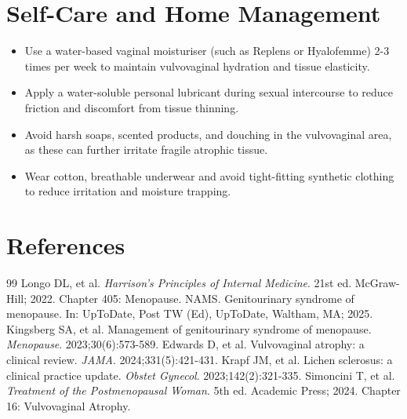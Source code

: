 \section*{Self-Care and Home Management}
\begin{itemize}
  \item Use a water-based vaginal moisturiser (such as Replens or Hyalofemme) 2-3 times per week to maintain vulvovaginal hydration and tissue elasticity.
  \item Apply a water-soluble personal lubricant during sexual intercourse to reduce friction and discomfort from tissue thinning.
  \item Avoid harsh soaps, scented products, and douching in the vulvovaginal area, as these can further irritate fragile atrophic tissue.
  \item Wear cotton, breathable underwear and avoid tight-fitting synthetic clothing to reduce irritation and moisture trapping.
\end{itemize}

\section*{References}

\begin{thebibliography}{99}
 Longo DL, et al. \emph{Harrison's Principles of Internal Medicine}. 21st ed. McGraw-Hill; 2022. Chapter 405: Menopause.
 NAMS. Genitourinary syndrome of menopause. In: UpToDate, Post TW (Ed), UpToDate, Waltham, MA; 2025.
 Kingsberg SA, et al. Management of genitourinary syndrome of menopause. \emph{Menopause}. 2023;30(6):573-589.
 Edwards D, et al. Vulvovaginal atrophy: a clinical review. \emph{JAMA}. 2024;331(5):421-431.
 Krapf JM, et al. Lichen sclerosus: a clinical practice update. \emph{Obstet Gynecol}. 2023;142(2):321-335.
 Simoncini T, et al. \emph{Treatment of the Postmenopausal Woman}. 5th ed. Academic Press; 2024. Chapter 16: Vulvovaginal Atrophy.
\end{thebibliography}
